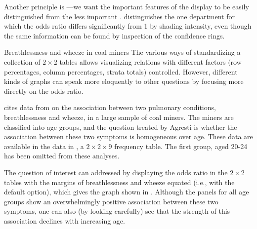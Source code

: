 \documentclass[11pt]{book}
\renewenvironment{knitrout}{\small\renewcommand{\baselinestretch}{.85}}{} %
\begin{document}
Another principle is ---we want the important
features
of the display to be easily distinguished from the less important
\citep{Tukey:93}.
 distinguishes the one department for which
the odds ratio differs significantly from 1 by shading intensity,
even though the same information can be found by inspection of the
confidence rings.

\begin{Example}[wheeze1]{Breathlessness and wheeze in coal miners}
The various ways of standardizing a collection of $2 \times 2$ tables
allows visualizing relations with different factors
(row percentages, column percentages, strata totals) controlled.
However, different kinds of graphs can speak more eloquently to other questions by focusing more directly on the odds ratio.

\citet[Table 9.8]{Agresti:2002} cites data from
\citet{AshfordSowden:70} on the association between
two pulmonary conditions, breathlessness and wheeze, in a large sample of coal miners.
The miners are classified into age groups, and the question treated
by Agresti is whether the association between these two symptoms
is homogeneous over age.%
These data are available in the  data in
, a $2 \times 2 \times 9$ frequency table.
The first group, aged 20-24 has been omitted from these
analyses.
\begin{knitrout}
\color{fgcolor}\begin{kframe}
\begin{alltt}
\hlstd{(}\hlstd{,} \hlstd{=}\hlstd{)}
 \hlkwb{<-} \hlstd{CoalMiners[,,}\hlopt{:}\hlstd{]}
\end{alltt}


{\ttfamily\noindent\bfseries\color{errorcolor}{\#\# Error: subscript out of bounds}}\begin{alltt}
  \hlstd{=} \hlstd{)}
\end{alltt}


{\ttfamily\noindent\bfseries\color{errorcolor}{\#\# Error: object 'CM' not found}}\end{kframe}
\end{knitrout}

The question of interest
can addressed by displaying the odds ratio
in the $2 \times 2$ tables with the margins of breathlessness
and wheeze equated (i.e., with the default  option),
which gives the graph shown in .
Although the panels for all age groups show an overwhelmingly
positive association between these two symptoms, one can also
(by looking carefully)
see that the strength of this association declines with increasing
age.


\end{Example}
\end{document}
